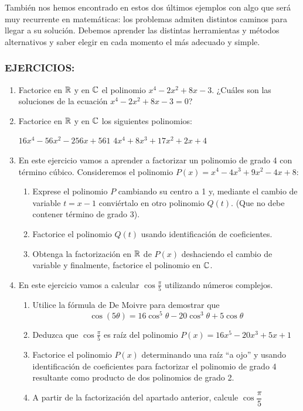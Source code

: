 También nos hemos encontrado en estos dos últimos ejemplos con algo que será muy recurrente en matemáticas: los problemas admiten distintos caminos para llegar a su solución.
Debemos aprender las distintas herramientas y métodos alternativos y saber elegir en cada momento el más adecuado y simple.


\subsubsection{EJERCICIOS:}

\begin{enumerate}

\item
Factorice en $\mathbb{R}$ y en $\mathbb{C}$ el polinomio $x^4-2x^2+8x-3$.
¿Cuáles son las soluciones de la ecuación $x^4-2x^2+8x-3=0$?


\item
Factorice en $\mathbb{R}$ y en $\mathbb{C}$ los siguientes polinomios:
\setcontadoralph
\vspace{-.5em}
\begin{centrar}
\nitem
$16x^4-56x^2-256x+561$\hfill
\nitem
$4x^4+8x^3+17x^2+2x+4$
\end{centrar}


\item
En este ejercicio vamos a aprender a factorizar un polinomio de grado 4 con término cúbico.
Consideremos el polinomio $P(x)=x^4-4x^3+9x^2-4x+8$:
\begin{enumerate}
\item
Exprese el polinomio $P$ cambiando su centro a 1 y, mediante el cambio de variable $t=x-1$ conviértalo en otro polinomio $Q(t)$. (Que no debe contener término de grado 3).
\item
Factorice el polinomio $Q(t)$ usando identificación de coeficientes.
\item
Obtenga la factorización en $\mathbb{R}$ de $P(x)$ deshaciendo el cambio de variable y finalmente, factorice el polinomio en $\mathbb{C}$.
\end{enumerate}


\item
En este ejercicio vamos a calcular $\cos\frac{\pi}{5}$ utilizando números complejos.
\begin{enumerate}
\item
Utilice la fórmula de De Moivre para demostrar que
\[\cos(5\theta)=16\cos^5\theta-20\cos^3\theta+5\cos\theta\]
\item
Deduzca que $\cos\frac{\pi}{5}$ es raíz del polinomio $P(x)=16x^5-20x^3+5x+1$
\item
Factorice el polinomio $P(x)$ determinando una raíz ``a ojo'' y usando identificación de coeficientes para factorizar el polinomio de grado 4 resultante como producto de dos polinomios de grado 2.
\item
A partir de la factorización del apartado anterior, calcule $\cos\dfrac{\pi}{5}$
\end{enumerate}


\end{enumerate}